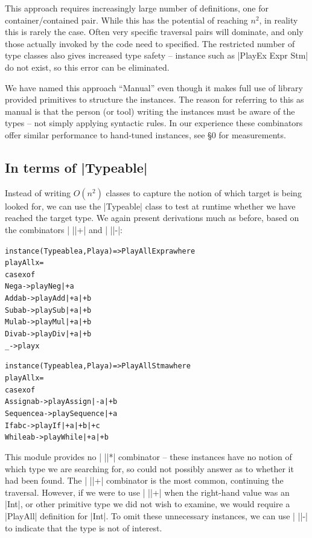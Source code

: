 \documentclass[preprint]{sigplanconf}
\newenvironment{code}{\begin{alltt}\small}{\end{alltt}}
\begin{document}
This approach requires increasingly large number of definitions, one for container/contained pair. While this has the potential of reaching $n^2$, in reality this is rarely the case. Often very specific traversal pairs will dominate, and only those actually invoked by the code need to specified. The restricted number of type classes also gives increased type safety -- instance such as |PlayEx Expr Stm| do not exist, so this error can be eliminated.

We have named this approach ``Manual'' even though it makes full use of library provided primitives to structure the instances. The reason for referring to this as manual is that the person (or tool) writing the instances must be aware of the types -- not simply applying syntactic rules. In our experience these combinators offer similar performance to hand-tuned instances, see \S0 for measurements.


\subsection{In terms of |Typeable|}

Instead of writing $O(n^2)$ classes to capture the notion of which target is being looked for, we can use the |Typeable| class to test at runtime whether we have reached the target type. We again present derivations much as before, based on the combinators | ||+| and | ||-|:

\begin{code}
instance (Typeable a, Play a) => PlayAll Expr a where
    playAll x =
        case x of
            Neg a    ->  play Neg  |+ a
            Add a b  ->  play Add  |+ a |+ b
            Sub a b  ->  play Sub  |+ a |+ b
            Mul a b  ->  play Mul  |+ a |+ b
            Div a b  ->  play Div  |+ a |+ b
            _        ->  play x

instance (Typeable a, Play a) => PlayAll Stm a where
    playAll x =
        case x of
            Assign    a b    -> play Assign    |-  a |+ b
            Sequence  a      -> play Sequence  |+  a
            If        a b c  -> play If        |+  a |+ b |+ c
            While     a b    -> play While     |+  a |+ b
\end{code}

This module provides no | ||*| combinator -- these instances have no notion of which type we are searching for, so could not possibly answer as to whether it had been found. The | ||+| combinator is the most common, continuing the traversal. However, if we were to use | ||+| when the right-hand value was an |Int|, or other primitive type we did not wish to examine, we would require a |PlayAll| definition for |Int|. To omit these unnecessary instances, we can use | ||-| to indicate that the type is not of interest.
\end{document}
